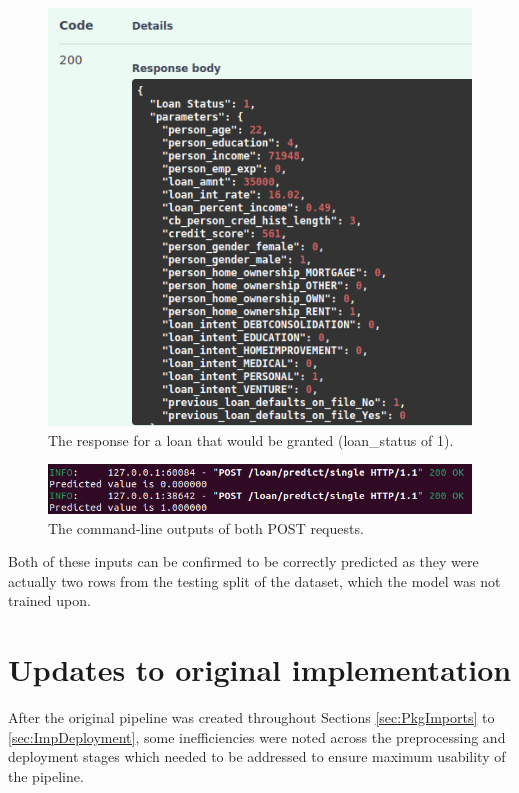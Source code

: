 \documentclass[12pt]{report}
\newcommand{\para}{\vspace{7pt}\noindent}
\begin{document}
\begin{figure}[H]
    \centering
    \includegraphics[width=\linewidth]{Implementation/FastAPI+Uvi/TruePositive.png}
    \caption{The response for a loan that would be granted (loan\_status of 1).}
    \label{fig:UviTruePositive}
\end{figure}

\begin{figure}[H]
    \centering
    \includegraphics[width=\linewidth]{Implementation/FastAPI+Uvi/TruePredictionsCLI.png}
    \caption{The command-line outputs of both POST requests.}
    \label{fig:UviCLI}
\end{figure}

\para Both of these inputs can be confirmed to be correctly predicted as they were actually two 
rows from the testing split of the dataset, which the model was not trained upon.

\chapter{Updates to original implementation}
After the original pipeline was created throughout Sections \ref{sec:PkgImports} to \ref{sec:ImpDeployment}, 
some inefficiencies were noted across the preprocessing and deployment stages which needed to be addressed  to ensure 
maximum usability of the pipeline.
\end{document}
